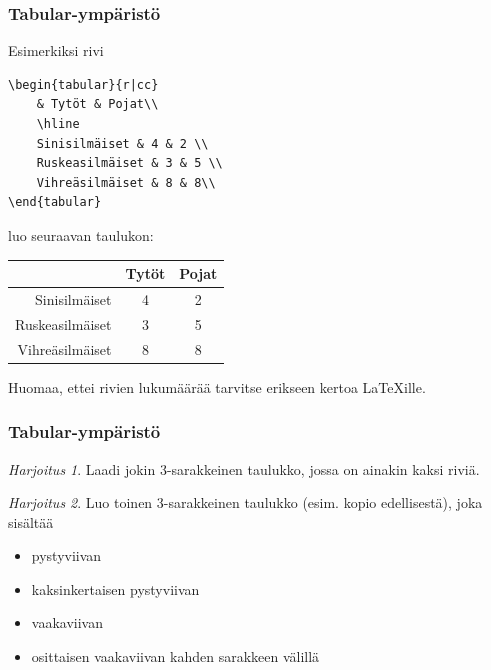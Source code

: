 \documentclass[handout,hyperref={colorlinks=true}]{beamer}
\theoremstyle{remark}
\newtheorem{harj}{Harjoitus}[section]
\begin{document}
\begin{frame}[fragile]
    \frametitle{Tabular-ympäristö}
    Esimerkiksi rivi
    \begin{scriptsize}
        \begin{Verbatim}[frame=single]
\begin{tabular}{r|cc}
    & Tytöt & Pojat\\
    \hline
    Sinisilmäiset & 4 & 2 \\
    Ruskeasilmäiset & 3 & 5 \\
    Vihreäsilmäiset & 8 & 8\\
\end{tabular}
        \end{Verbatim}
    \end{scriptsize}
    luo seuraavan taulukon:
    \begin{framed} 
        \begin{tabular}{r|cc}
            & Tytöt & Pojat\\
            \hline
            Sinisilmäiset & 4 & 2 \\
            Ruskeasilmäiset & 3 & 5 \\
            Vihreäsilmäiset & 8 & 8\\
        \end{tabular}
    \end{framed}
    Huomaa, ettei rivien lukumäärää tarvitse erikseen kertoa \LaTeX ille.

\end{frame}



\begin{frame}[fragile]
    \frametitle{Tabular-ympäristö}
    \begin{harj}
        Laadi jokin 3-sarakkeinen taulukko, jossa on ainakin kaksi riviä.  
    \end{harj}
    \begin{harj}
        Luo toinen 3-sarakkeinen taulukko (esim. kopio edellisestä), joka sisältää 
        \begin{itemize}
            \item pystyviivan
            \item kaksinkertaisen pystyviivan
            \item vaakaviivan
            \item osittaisen vaakaviivan kahden sarakkeen välillä
        \end{itemize}
    \end{harj}
\end{frame}
\end{document}
